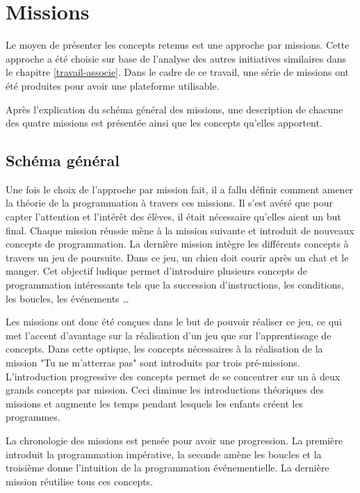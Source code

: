 \section{Missions}
\label{missions}
Le moyen de présenter les concepts retenus est une approche par \glspl{mission}. Cette approche a été choisie sur base de l'analyse des autres initiatives similaires dans le chapitre \ref{travail-associe}. Dans le cadre de ce travail, une série de \glspl{mission} ont été produites pour avoir une plateforme utilisable.

Après l'explication du schéma général des \glspl{mission}, une description de chacune des quatre \glspl{mission} est présentée ainsi que les concepts qu'elles apportent.

\subsection{Schéma général}
Une fois le choix de l'approche par mission fait, il a fallu définir comment amener la théorie de la programmation à travers ces \glspl{mission}. Il s'est avéré que pour capter l'attention et l'intérêt des élèves, il était nécessaire qu'elles aient un but final. Chaque \gls{mission} réussie mène à la mission suivante et introduit de nouveaux concepts de programmation. La dernière mission intègre les différents concepts à travers un jeu de poursuite. Dans ce jeu, un chien doit courir après un chat et le manger. Cet objectif ludique permet d'introduire plusieurs concepts de programmation intéressants tels que la succession d'instructions, les conditions, les boucles, les événements \ldots

Les \glspl{mission} ont donc été conçues dans le but de pouvoir réaliser ce jeu, ce qui met l'accent d'avantage sur la réalisation d'un jeu que sur l'apprentissage de concepts. Dans cette optique, les concepts nécessaires à la réalisation de la \gls{mission} "Tu ne m'atterras pas" sont introduits par trois pré-missions. L'introduction progressive des concepts permet de se concentrer sur un à deux grands concepts par \gls{mission}. Ceci diminue les introductions théoriques des \glspl{mission} et augmente les temps pendant lesquels les enfants créent les programmes.

La chronologie des \glspl{mission} est pensée pour avoir une progression. La première introduit la programmation impérative, la seconde amène les boucles et la troisième donne l'intuition de la programmation événementielle. La dernière \gls{mission} réutilise tous ces concepts.

